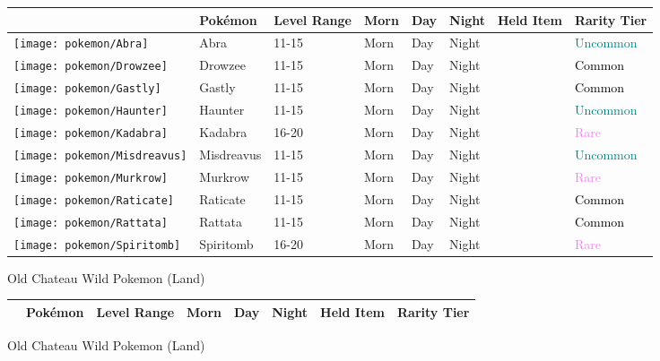 \begin{longtable}{||l l l l l l l l||}%
\hline%
&Pokémon&Level Range&Morn&Day&Night&Held Item&Rarity Tier\\%
\hline%
\endhead%
\hline%
\texttt{[image: pokemon/Abra]}&Abra&11{-}15&Morn&Day&Night&&\textcolor{teal}{%
Uncommon%
}\\%
\hline%
\texttt{[image: pokemon/Drowzee]}&Drowzee&11{-}15&Morn&Day&Night&&\textcolor{black}{%
Common%
}\\%
\hline%
\texttt{[image: pokemon/Gastly]}&Gastly&11{-}15&Morn&Day&Night&&\textcolor{black}{%
Common%
}\\%
\hline%
\texttt{[image: pokemon/Haunter]}&Haunter&11{-}15&Morn&Day&Night&&\textcolor{teal}{%
Uncommon%
}\\%
\hline%
\texttt{[image: pokemon/Kadabra]}&Kadabra&16{-}20&Morn&Day&Night&&\textcolor{violet}{%
Rare%
}\\%
\hline%
\texttt{[image: pokemon/Misdreavus]}&Misdreavus&11{-}15&Morn&Day&Night&&\textcolor{teal}{%
Uncommon%
}\\%
\hline%
\texttt{[image: pokemon/Murkrow]}&Murkrow&11{-}15&Morn&Day&Night&&\textcolor{violet}{%
Rare%
}\\%
\hline%
\texttt{[image: pokemon/Raticate]}&Raticate&11{-}15&Morn&Day&Night&&\textcolor{black}{%
Common%
}\\%
\hline%
\texttt{[image: pokemon/Rattata]}&Rattata&11{-}15&Morn&Day&Night&&\textcolor{black}{%
Common%
}\\%
\hline%
\texttt{[image: pokemon/Spiritomb]}&Spiritomb&16{-}20&Morn&Day&Night&&\textcolor{violet}{%
Rare%
}\\%
\hline%
\end{longtable}%
\caption{Old Chateau Wild Pokemon (Land)}%
\begin{longtable}{||l l l l l l l l||}%
\hline%
&Pokémon&Level Range&Morn&Day&Night&Held Item&Rarity Tier\\%
\hline%
\endhead%
\hline%
\end{longtable}%
\caption{Old Chateau Wild Pokemon (Land)}%
